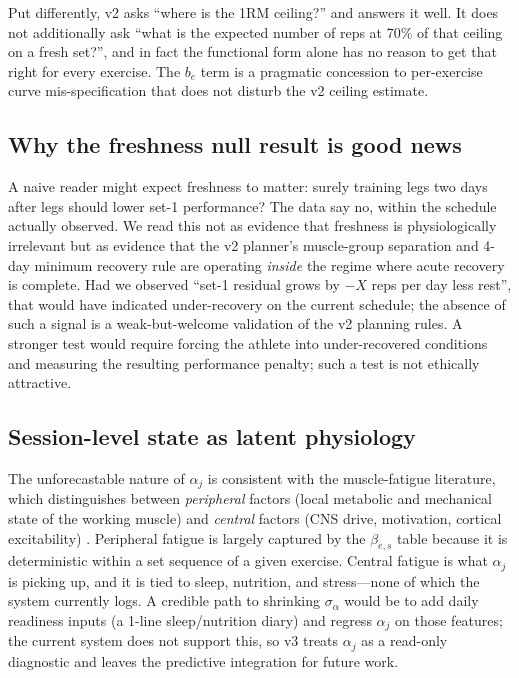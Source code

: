 \documentclass[11pt]{article}
\begin{document}
Put differently, v2 asks \enquote{where is the 1RM ceiling?} and answers it well.
It does not additionally ask \enquote{what is the expected number of reps at 70\% of that ceiling on a fresh set?}, and in fact the functional form alone has no reason to get that right for every exercise.
The $b_e$ term is a pragmatic concession to per-exercise curve mis-specification that does not disturb the v2 ceiling estimate.

\subsection{Why the freshness null result is good news}
A naive reader might expect freshness to matter: surely training legs two days after legs should lower set-1 performance?
The data say no, within the schedule actually observed.
We read this not as evidence that freshness is physiologically irrelevant but as evidence that the v2 planner's muscle-group separation and 4-day minimum recovery rule are operating \emph{inside} the regime where acute recovery is complete.
Had we observed \enquote{set-1 residual grows by $-X$ reps per day less rest}, that would have indicated under-recovery on the current schedule; the absence of such a signal is a weak-but-welcome validation of the v2 planning rules.
A stronger test would require forcing the athlete into under-recovered conditions and measuring the resulting performance penalty; such a test is not ethically attractive.

\subsection{Session-level state as latent physiology}
The unforecastable nature of $\alpha_j$ is consistent with the muscle-fatigue literature, which distinguishes between \emph{peripheral} factors (local metabolic and mechanical state of the working muscle) and \emph{central} factors (CNS drive, motivation, cortical excitability) \parencite{Enoka2008}.
Peripheral fatigue is largely captured by the $\beta_{e,s}$ table because it is deterministic within a set sequence of a given exercise.
Central fatigue is what $\alpha_j$ is picking up, and it is tied to sleep, nutrition, and stress---none of which the system currently logs.
A credible path to shrinking $\sigma_\alpha$ would be to add daily readiness inputs (a 1-line sleep/nutrition diary) and regress $\alpha_j$ on those features; the current system does not support this, so v3 treats $\alpha_j$ as a read-only diagnostic and leaves the predictive integration for future work.
\end{document}
